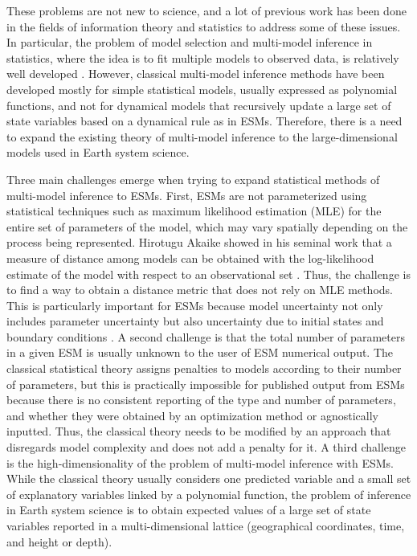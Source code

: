 \documentclass[gmd, manuscript]{copernicus}
\begin{document}
These problems are not new to science, and a lot of previous work has been done in the fields of information theory and statistics to address some of these issues. In particular, the problem of model selection and multi-model inference in statistics, where the idea is to fit multiple models to observed data, is relatively well developed \citep{Anderson2007, Burnham2002, Millington2011, Claeskens2008}. However, classical multi-model inference methods have been developed mostly for simple statistical models, usually expressed as polynomial functions, and not for dynamical models that recursively update a large set of state variables based on a dynamical rule as in ESMs. Therefore, there is a need to expand the existing theory of multi-model inference to the large-dimensional models used in Earth system science.

Three main challenges emerge when trying to expand statistical methods of multi-model inference to ESMs. First, ESMs are not parameterized using statistical techniques such as maximum likelihood estimation (MLE) for the entire set of parameters of the model, which may vary spatially depending on the process being represented. Hirotugu Akaike showed in his seminal work that a measure of distance among models can be obtained with the log-likelihood estimate of the model with respect to an observational set \citep{Akaike1974, Akaike1981}. Thus, the challenge is to find a way to obtain a distance metric that does not rely on MLE methods. This is particularly important for ESMs because model uncertainty not only includes parameter uncertainty but also uncertainty due to initial states and boundary conditions \citep{Tebaldi2007}.
A second challenge is that the total number of parameters in a given ESM is usually unknown to the user of ESM numerical output. The classical statistical theory assigns penalties to models according to their number of parameters, but this is practically impossible for published output from ESMs because there is no consistent reporting of the type and number of parameters, and whether they were obtained by an optimization method or agnostically inputted. Thus, the classical theory needs to be modified by an approach that disregards model complexity and does not add a penalty for it. 
A third challenge is the high-dimensionality of the problem of multi-model inference with ESMs. While the classical theory usually considers one predicted variable and a small set of explanatory variables linked by a polynomial function, the problem of inference in Earth system science is to obtain expected values of a large set of state variables reported in a multi-dimensional lattice (geographical coordinates, time, and height or depth). 
\end{document}
